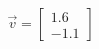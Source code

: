 \documentclass[preview]{standalone}
\begin{document}
\begin{align*}
\vec{v}=\begin{bmatrix}1.6\\-1.1\end{bmatrix}
\end{align*}
\end{document}
